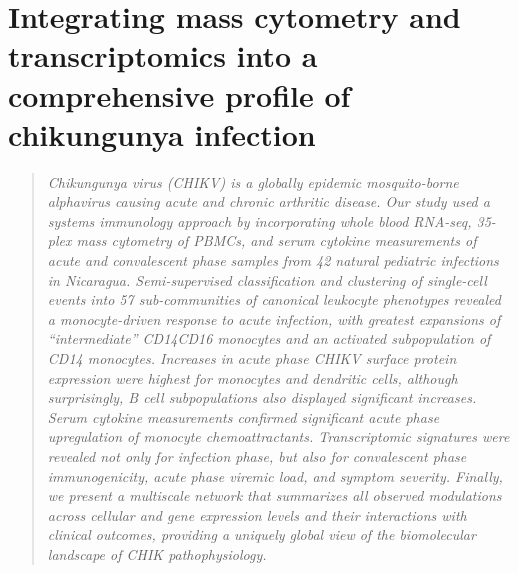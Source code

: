
\chapter{Integrating mass cytometry and transcriptomics into a comprehensive profile of chikungunya infection}
\label{chap:chik}

\newcommand{\subcommunity}{sub-\allowbreak com\-mu\-ni\-ty}
\newcommand{\subcommunities}{sub-\allowbreak com\-mu\-ni\-ties}
\newcommand{\Subcommunities}{Sub-\allowbreak com\-mu\-ni\-ties}
\newcommand{\pertranscript}{per-\allowbreak trans\-cript}



\begin{quote}
\emph{Chikungunya virus (CHIKV) is a globally epidemic mosquito-borne alphavirus causing acute and chronic arthritic disease. Our study used a systems immunology approach by incorporating whole blood RNA-seq, 35-plex mass cytometry of PBMCs, and serum cytokine measurements of acute and convalescent phase samples from 42 natural pediatric infections in Nicaragua. Semi-supervised classification and clustering of single-cell events into 57 \subcommunities{} of canonical leukocyte phenotypes revealed a monocyte-driven response to acute infection, with greatest expansions of “intermediate” CD14\sups{++}\allowbreak CD16\sups{+} monocytes and an activated subpopulation of CD14\sups{+} monocytes. Increases in acute phase CHIKV surface protein expression were highest for monocytes and dendritic cells, although surprisingly, B cell subpopulations also displayed significant increases. Serum cytokine measurements confirmed significant acute phase upregulation of monocyte chemoattractants. Transcriptomic signatures were revealed not only for infection phase, but also for convalescent phase immunogenicity, acute phase viremic load, and symptom severity. Finally, we present a multiscale network that summarizes all observed modulations across cellular and gene expression levels and their interactions with clinical outcomes, providing a uniquely global view of the biomolecular landscape of CHIK pathophysiology.}
\end{quote}

